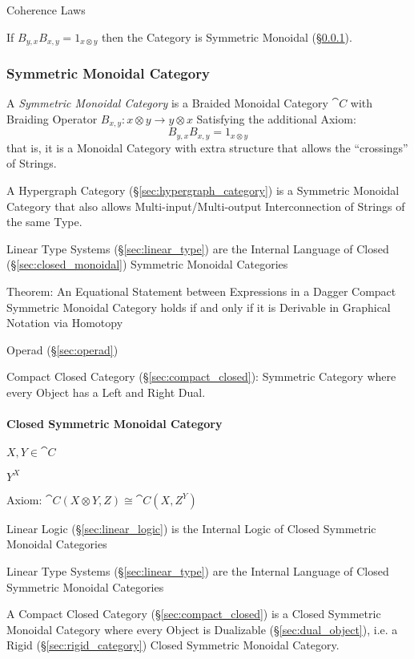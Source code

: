 Coherence Laws

If $B_{y,x} B_{x,y} = 1_{x \otimes y}$ then the Category is Symmetric
Monoidal (\S\ref{sec:symmetric_monoidal}).



\subsubsection{Symmetric Monoidal Category}
\label{sec:symmetric_monoidal}

A \emph{Symmetric Monoidal Category} is a Braided Monoidal Category
$\cat{C}$ with Braiding Operator $B_{x,y} : x \otimes y \rightarrow y
\otimes x$ Satisfying the additional Axiom:
\[
  B_{y,x} B_{x,y} = 1_{x \otimes y}
\]
that is, it is a Monoidal Category with extra structure that allows
the ``crossings'' of Strings.

A Hypergraph Category (\S\ref{sec:hypergraph_category}) is a Symmetric
Monoidal Category that also allows Multi-input/Multi-output
Interconnection of Strings of the same Type.

Linear Type Systems (\S\ref{sec:linear_type}) are the Internal
Language of Closed (\S\ref{sec:closed_monoidal}) Symmetric Monoidal
Categories

Theorem: An Equational Statement between Expressions in a Dagger
Compact Symmetric Monoidal Category holds if and only if it is
Derivable in Graphical Notation via Homotopy %

Operad (\S\ref{sec:operad})

Compact Closed Category (\S\ref{sec:compact_closed}): Symmetric
Category where every Object has a Left and Right Dual.



\paragraph{Closed Symmetric Monoidal Category}\hfill
\label{sec:closed_symmetric_monoidal}

$X, Y \in \cat{C}$

$Y^X$

Axiom: $\cat{C}(X \otimes Y, Z) \cong \cat{C}(X, Z^Y)$

Linear Logic (\S\ref{sec:linear_logic}) is the Internal Logic of
Closed Symmetric Monoidal Categories

Linear Type Systems (\S\ref{sec:linear_type}) are the Internal
Language of Closed Symmetric Monoidal Categories

A Compact Closed Category (\S\ref{sec:compact_closed}) is a Closed
Symmetric Monoidal Category where every Object is Dualizable
(\S\ref{sec:dual_object}), i.e. a Rigid (\S\ref{sec:rigid_category})
Closed Symmetric Monoidal Category.



